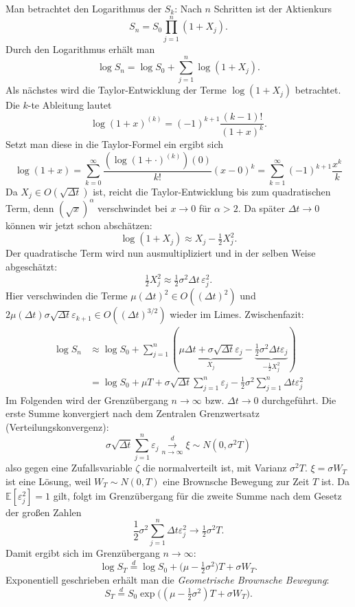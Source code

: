 Man betrachtet den Logarithmus der $S_k$: Nach $n$ Schritten ist der Aktienkurs
$$
S_n = S_0 \prod_{j=1}^n (1 + X_j).
$$
Durch den Logarithmus erhält man
$$
\log S_n = \log S_0 + \sum_{j=1}^n \log(1+X_j).
$$
Als nächstes wird die Taylor-Entwicklung der Terme $\log(1+X_j)$ betrachtet. Die $k$-te Ableitung lautet
$$\log(1+x)^{(k)}=(-1)^{k+1} \frac{(k-1)!}{(1+x)^k}.$$
Setzt man diese in die Taylor-Formel ein ergibt sich
$$\log(1+x) = \sum_{k=0}^{\infty} \frac{(\log(1+\cdot)^{(k)})(0)}{k!}(x-0)^k= \sum_{k=1}^\infty(-1)^{k+1} \frac{x^k}{k}$$
Da $X_j \in O(\sqrt{\Delta t})$ ist, reicht die Taylor-Entwicklung bis zum quadratischen Term, denn $(\sqrt{x})^\alpha$ verschwindet bei $x \to 0$ für $\alpha \gt 2$. Da später $\Delta t \to 0$ können wir jetzt schon abschätzen:
$$
\log(1+X_j) \approx X_j - \tfrac12 X_j^2.
$$
Der quadratische Term wird nun ausmultipliziert und in der selben Weise abgeschätzt:
$$
\tfrac12 X_j^2 \approx \tfrac12 \sigma^2 \Delta t \,\varepsilon_j^2.
$$
Hier verschwinden die Terme $\mu (\Delta t)^2 \in O((\Delta t)^{2})$ und $2 \mu (\Delta t) \sigma \sqrt{\Delta t} \varepsilon_{k+1} \in O((\Delta t)^{3/2})$ wieder im Limes. Zwischenfazit:
$$
\begin{aligned}
\log S_n &\approx \log S_0 + \sum_{j=1}^n\left( \underbrace{\mu \Delta t + \sigma\sqrt{\Delta t} \varepsilon_j}_{X_j} - \underbrace{\frac{1}{2} \sigma^2 \Delta t \varepsilon_j}_{-\frac{1}{2} X_j^2} \right)
\\ &= \log S_0 + \mu T + \sigma\sqrt{\Delta t} \sum_{j=1}^{n} \varepsilon_j - \frac{1}{2} \sigma^2 \sum_{j=1}^{n} \Delta t \varepsilon_j^2 
\end{aligned}
$$
Im Folgenden wird der Grenzübergang $n \longrightarrow \infty$ bzw. $\Delta t \longrightarrow 0$ durchgeführt. 
Die erste Summe konvergiert nach dem Zentralen Grenzwertsatz (Verteilungskonvergenz):
$$
\sigma \sqrt{\Delta t} \sum_{j=1}^n \varepsilon_j \overset{d}{\underset{n \to \infty}{\longrightarrow}} \xi \sim N(0, \sigma^2 T)
$$
 also gegen eine Zufallsvariable $\zeta$ die normalverteilt ist, mit Varianz $\sigma^2 T$.  $\xi = \sigma W_T$ ist eine Lösung, 
 weil $W_T \sim N(0, T)$ eine Brownsche Bewegung zur Zeit $T$ ist. 
 Da $\mathbb{E}[\varepsilon_j^2] = 1$ gilt, folgt im Grenzübergang für die zweite Summe nach dem Gesetz der großen Zahlen
$$
\frac{1}{2} \sigma^2 \sum_{j=1}^{n} \Delta t \varepsilon_j^2  \longrightarrow \tfrac12 \sigma^2 T.
$$
Damit ergibt sich im Grenzübergang $n \to \infty$:
$$
\log S_T \overset{d} = \log S_0 + \big(\mu - \tfrac12 \sigma^2\big)T + \sigma W_T.
$$Exponentiell geschrieben erhält man die \textit{Geometrische Brownsche Bewegung}:
$$
S_T \overset d = S_0 \exp\!\Big( (\mu - \tfrac12 \sigma^2)T + \sigma W_T \Big).
$$

